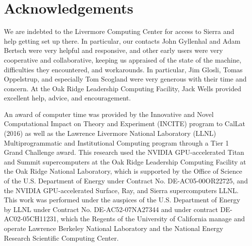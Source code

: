 \section{Acknowledgements}

We are indebted to the Livermore Computing Center for access to Sierra and help getting set up there.
In particular, our contacts John Gyllenhal and Adam Bertsch were very helpful and responsive, and other early users were very cooperative and collaborative, keeping us appraised of the state of the machine, difficulties they encountered, and workarounds.  In particular, Jim Glosli, Tomas Oppelstrup, and especially Tom Scogland were very generous with their time and concern.  At the Oak Ridge Leadership Computing Facility, Jack Wells provided excellent help, advice, and encouragement.

An award of computer time was provided by the Innovative and Novel Computational Impact on Theory and Experiment (INCITE) program to CalLat (2016) as well as the Lawrence Livermore National Laboratory (LLNL) Multiprogrammatic and Institutional Computing program through a Tier 1 Grand Challenge award. This research used the NVIDIA GPU-accelerated Titan and Summit supercomputers at the Oak Ridge Leadership Computing Facility at the Oak Ridge National Laboratory, which is supported by the Office of Science of the U.S. Department of Energy under Contract No. DE-AC05-00OR22725, and the NVIDIA GPU-accelerated Surface, Ray, and Sierra supercomputers LLNL.  This work was performed under the auspices of the U.S. Department of Energy by LLNL under Contract No. DE-AC52-07NA27344 and under contract DE-AC02-05CH11231, which the Regents of the University of California manage and operate Lawrence Berkeley National Laboratory and the National Energy Research Scientific Computing Center.
